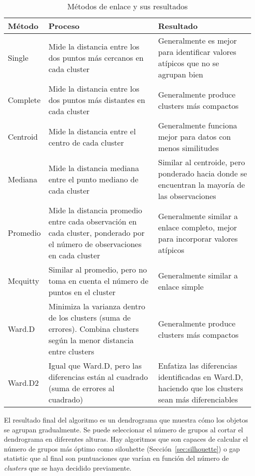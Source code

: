 \begin{table}[H]
    \centering
    \begin{tabular}{|p{3.5cm}|p{6cm}|p{6cm}|}
    \hline
    \textbf{Método} & \textbf{Proceso} & \textbf{Resultado} \\
    \hline
    Single & Mide la distancia entre los dos puntos más cercanos en cada cluster & Generalmente es mejor para identificar valores atípicos que no se agrupan bien \\
    \hline
    Complete & Mide la distancia entre los dos puntos más distantes en cada cluster & Generalmente produce clusters más compactos \\
    \hline
    Centroid & Mide la distancia entre el centro de cada cluster & Generalmente funciona mejor para datos con menos similitudes \\
    \hline
    Mediana & Mide la distancia mediana entre el punto mediano de cada cluster & Similar al centroide, pero ponderado hacia donde se encuentran la mayoría de las observaciones \\
    \hline
    Promedio & Mide la distancia promedio entre cada observación en cada cluster, ponderado por el número de observaciones en cada cluster & Generalmente similar a enlace completo, mejor para incorporar valores atípicos \\
    \hline
    Mcquitty & Similar al promedio, pero no toma en cuenta el número de puntos en el cluster & Generalmente similar a enlace simple \\
    \hline
    Ward.D & Minimiza la varianza dentro de los clusters (suma de errores). Combina clusters según la menor distancia entre clusters & Generalmente produce clusters más compactos \\
    \hline
    Ward.D2 & Igual que Ward.D, pero las diferencias están al cuadrado (suma de errores al cuadrado) & Enfatiza las diferencias identificadas en Ward.D, haciendo que los clusters sean más diferenciables \\
    \hline
    \end{tabular}
    \caption{Métodos de enlace y sus resultados}
\end{table}

El resultado final del algoritmo es un dendrograma que muestra cómo los objetos se agrupan gradualmente. Se puede seleccionar el número de grupos al cortar el dendrograma en diferentes alturas. Hay algoritmos que son capaces de calcular el número de grupos más óptimo como silouhette (Sección~\ref{sec:silhouette}) o gap statistic que al final son puntuaciones que varían en función del número de \textit{clusters} que se haya decidido previamente.

